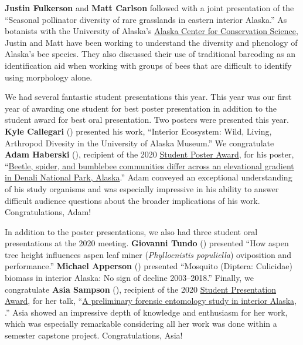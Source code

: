 \begin{multicols}{2}
\textbf{Justin Fulkerson} and \textbf{Matt Carlson} followed with a joint presentation of the ``Seasonal pollinator diversity of rare grasslands in eastern interior Alaska.'' As botanists with the University of Alaska’s \href{https://accs.uaa.alaska.edu/}{Alaska Center for Conservation Science}, Justin and Matt have been working to understand the diversity and phenology of Alaska’s bee species. They also discussed their use of traditional barcoding as an identification aid when working with groups of bees that are difficult to identify using morphology alone.

We had several fantastic student presentations this year. This year was our first year of awarding one student for best poster presentation in addition to the student award for best oral presentation. Two posters were presented this year. \textbf{Kyle Callegari} () presented his work, ``Interior Ecosystem: Wild, Living, Arthropod Divesity in the University of Alaska Museum.'' We congratulate \textbf{Adam Haberski} (), recipient of the 2020 \href{http://www.akentsoc.org/student-presentation-award}{Student Poster Award}, for his poster, ``\href{http://www.akentsoc.org/doc/Haberski_A_et_al_2020.pdf}{Beetle, spider, and bumblebee communities differ across an elevational gradient in Denali National Park, Alaska}.'' Adam conveyed an exceptional understanding of his study organisms and was especially impressive in his ability to answer difficult audience questions about the broader implications of his work. Congratulations, Adam!

In addition to the poster presentations, we also had three student oral presentations at the 2020 meeting. \textbf{Giovanni Tundo} () presented ``How aspen tree height influences aspen leaf miner (\textit{Phyllocnistis populiella}) oviposition and performance.'' \textbf{Michael Apperson} () presented ``Mosquito (Diptera: Culicidae) biomass in interior Alaska: No sign of decline 2003--2018.'' Finally, we congratulate \textbf{Asia Sampson} (), recipient of the 2020 \href{http://www.akentsoc.org/student-presentation-award}{Student Presentation Award}, for her talk, ``\href{http://www.akentsoc.org/doc/Sampson_A_2020.pdf}{A preliminary forensic entomology study in interior Alaska, }.'' Asia showed an impressive depth of knowledge and enthusiasm for her work, which was especially remarkable considering all her work was done within a semester capstone project. Congratulations, Asia!



\end{multicols}
